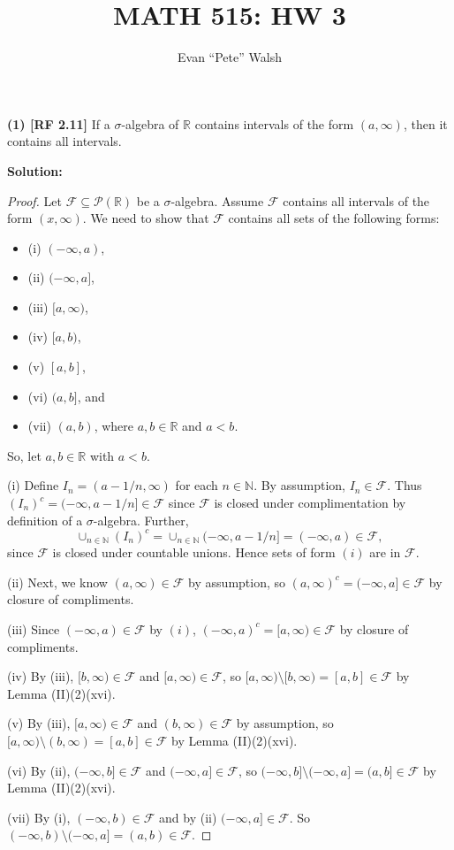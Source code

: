 \documentclass[12pt]{article}
\title{MATH 515: HW 3}
\author{Evan ``Pete'' Walsh}
\begin{document}
\maketitle

{\bf (1) [RF 2.11]} If a $\sigma$-algebra of $\mathbb{R}$ contains intervals of the form $(a, \infty)$, then it contains all intervals.

{\bf Solution:}

\begin{proof}
Let $\mathcal{F} \subseteq \mathcal{P}(\mathbb{R})$ be a $\sigma$-algebra. Assume $\mathcal{F}$ contains all intervals of the form $(x, \infty)$. We
need to show that $\mathcal{F}$ contains all sets of the following forms:

\begin{itemize}[label={},leftmargin=4mm, itemsep=1em, parsep=0em]
\item (i) $(-\infty, a)$,
\item (ii) $(-\infty, a]$, 
\item (iii) $[a, \infty)$,
\item (iv) $[a, b)$,
\item (v) $[a,b]$,
\item (vi) $(a, b]$, and 
\item (vii) $(a, b)$, where $a, b \in \mathbb{R}$ and $a < b$.
\end{itemize}

So, let $a, b \in \mathbb{R}$ with $a < b$.

(i) Define $I_{n} = (a - 1/n, \infty)$ for each $n \in \mathbb{N}$. By assumption, $I_{n} \in \mathcal{F}$. Thus $(I_{n})^{c} = (-\infty, a - 1/n] \in
\mathcal{F}$ since $\mathcal{F}$ is closed under complimentation by definition of a $\sigma$-algebra. Further, 
\[ \cup_{n\in\mathbb{N}}(I_{n})^{c} = \cup_{n\in\mathbb{N}}(-\infty, a - 1/n] = (-\infty, a) \in \mathcal{F}, \]
since $\mathcal{F}$ is closed under countable unions. Hence sets of form $(i)$ are in $\mathcal{F}$.

(ii) Next, we know $(a, \infty) \in \mathcal{F}$ by assumption, so $(a, \infty)^{c} = (-\infty, a] \in \mathcal{F}$ by closure of compliments.

(iii) Since $(-\infty, a) \in \mathcal{F}$ by $(i)$, $(-\infty, a)^{c} = [a, \infty) \in \mathcal{F}$ by closure of compliments.

(iv) By (iii), $[b, \infty) \in \mathcal{F}$ and $[a,\infty) \in \mathcal{F}$, so $[a,\infty)\setminus [b,\infty) = [a,b] \in \mathcal{F}$ by Lemma
(II)(2)(xvi).

(v) By (iii), $[a, \infty) \in \mathcal{F}$ and $(b,\infty) \in \mathcal{F}$ by assumption, so $[a,\infty) \setminus (b,\infty) = [a,b] \in
\mathcal{F}$ by Lemma (II)(2)(xvi).

(vi) By (ii), $(-\infty, b] \in \mathcal{F}$ and $(-\infty, a] \in \mathcal{F}$, so $(-\infty, b] \setminus (-\infty, a] = (a,b] \in \mathcal{F}$ by
Lemma (II)(2)(xvi).

(vii) By (i), $(-\infty, b) \in \mathcal{F}$ and by (ii) $(-\infty, a] \in \mathcal{F}$. So $(-\infty, b) \setminus (-\infty, a] = (a,b) \in
\mathcal{F}$.
\end{proof}
\end{document}

